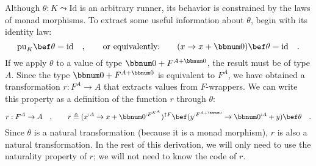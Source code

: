 Although $\theta:K\leadsto\text{Id}$ is an arbitrary runner, its
behavior is constrained by the laws of monad morphisms. To extract
some useful information about $\theta$, begin with its identity law:
\[
\text{pu}_{K}\bef\theta=\text{id}\quad,\quad\quad\text{or equivalently:}\quad\quad(x\rightarrow x+\bbnum 0)\bef\theta=\text{id}\quad.
\]
If we apply $\theta$ to a value of type $\bbnum 0+F^{A+\bbnum 0}$,
the result must be of type $A$. Since the type $\bbnum 0+F^{A+\bbnum 0}$
is equivalent to $F^{A}$, we have obtained a transformation $r:F^{A}\rightarrow A$
that extracts values from $F$-wrappers. We can write this property
as a definition of the function $r$ through $\theta$:
\[
r:F^{A}\rightarrow A\quad,\quad\quad r\triangleq(x^{:A}\rightarrow x+\bbnum 0^{:F^{K^{A}}})^{\uparrow F}\bef(y^{:F^{A+\bbnum 0}}\rightarrow\bbnum 0^{:A}+y)\bef\theta\quad.
\]
Since $\theta$ is a natural transformation (because it is a monad
morphism), $r$ is also a natural transformation. In the rest of this
derivation, we will only need to use the naturality property of $r$;
we will not need to know the code of $r$.

